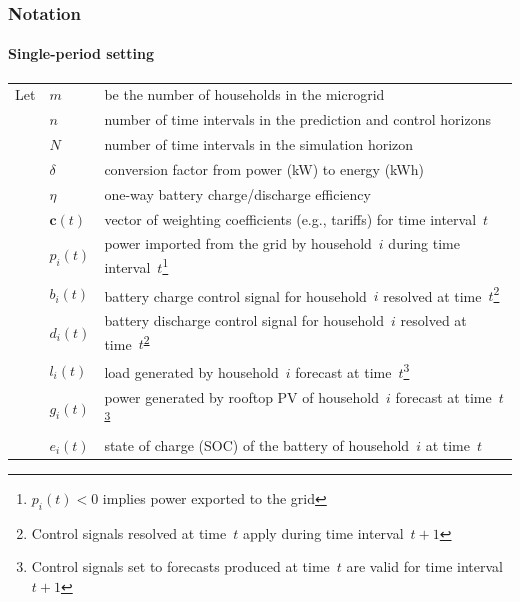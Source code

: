 \documentclass[presentation, smaller, xcolor=table]{beamer}
\def\el{l}
\begin{document}
\begin{frame}
	\frametitle{Notation}
	\framesubtitle{Single-period setting}
	
	\begin{tabular}{l l l}
		Let & $m$ & be the number of households in the microgrid\\
		& $n$ & number of time intervals in the prediction and control horizons\\
		& $N$ & number of time intervals in the simulation horizon\\
		& $\delta$ & conversion factor from power (kW) to energy (kWh)\\
		& $\eta$ & one-way battery charge/discharge efficiency\\
		& $\boldsymbol{c}(t)$ & vector of weighting coefficients (e.g., tariffs) for time interval~$t$\\
		& $p_{i}(t)$ & power imported from the grid by household~$i$ during time interval~$t$\footnote{
$p_{i}(t) < 0$ implies power exported to the grid	
}\\
		& $b_{i}(t)$ & battery charge control signal for household~$i$ resolved at time~$t$\footnote{\label{fn:symbol1}
Control signals resolved at time~$t$ apply during time interval~$t\!+\!1$
}\\
		& $d_{i}(t)$ & battery discharge control signal for household~$i$ resolved at time~$t$\textsuperscript{\ref{fn:symbol1}}\\
		& $\el_{i}(t)$ & load generated by household~$i$ forecast at time~$t$\footnote{\label{fn:symbol2}
Control signals set to forecasts produced at time~$t$ are valid for time interval~$t\!+\!1$
}\\
		& $g_{i}(t)$ & power generated by rooftop PV of household~$i$ forecast at time~$t$\textsuperscript{\ref{fn:symbol2}}\\
		& $e_{i}(t)$ & state of charge (SOC) of the battery of household~$i$ at time~$t$\\	
	\end{tabular}
	
\end{frame}
\end{document}
